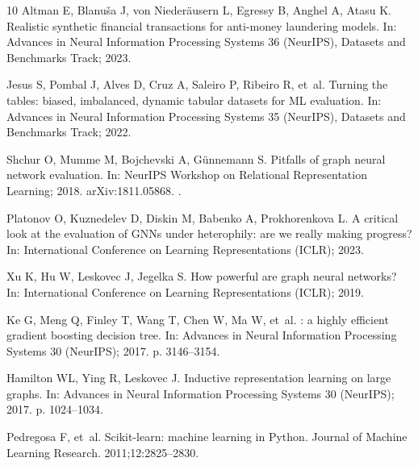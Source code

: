 \documentclass[pdflatex,sn-vancouver-num]{sn-jnl}
\begin{document}
\begin{thebibliography}{10}
Altman E, Blanu{\v{s}}a J, von Nieder{\"a}usern L, Egressy B, Anghel A, Atasu
  K.
\newblock Realistic synthetic financial transactions for anti-money laundering
  models.
\newblock In: Advances in Neural Information Processing Systems 36 (NeurIPS),
  Datasets and Benchmarks Track; 2023.

Jesus S, Pombal J, Alves D, Cruz A, Saleiro P, Ribeiro R, et~al.
\newblock Turning the tables: biased, imbalanced, dynamic tabular datasets for
  {ML} evaluation.
\newblock In: Advances in Neural Information Processing Systems 35 (NeurIPS),
  Datasets and Benchmarks Track; 2022.

Shchur O, Mumme M, Bojchevski A, G{\"u}nnemann S.
\newblock Pitfalls of graph neural network evaluation.
\newblock In: NeurIPS Workshop on Relational Representation Learning; 2018.
  {arXiv}:1811.05868.
\newblock {}.

Platonov O, Kuznedelev D, Diskin M, Babenko A, Prokhorenkova L.
\newblock A critical look at the evaluation of {GNNs} under heterophily: are we
  really making progress?
\newblock In: International Conference on Learning Representations (ICLR);
  2023.

Xu K, Hu W, Leskovec J, Jegelka S.
\newblock How powerful are graph neural networks?
\newblock In: International Conference on Learning Representations (ICLR);
  2019.

Ke G, Meng Q, Finley T, Wang T, Chen W, Ma W, et~al.
: a highly efficient gradient boosting decision tree.
\newblock In: Advances in Neural Information Processing Systems 30 (NeurIPS);
  2017. p. 3146--3154.

Hamilton WL, Ying R, Leskovec J.
\newblock Inductive representation learning on large graphs.
\newblock In: Advances in Neural Information Processing Systems 30 (NeurIPS);
  2017. p. 1024--1034.

Pedregosa F, et~al.
\newblock Scikit-learn: machine learning in {Python}.
\newblock Journal of Machine Learning Research. 2011;12:2825--2830.


\end{thebibliography}
\end{document}
